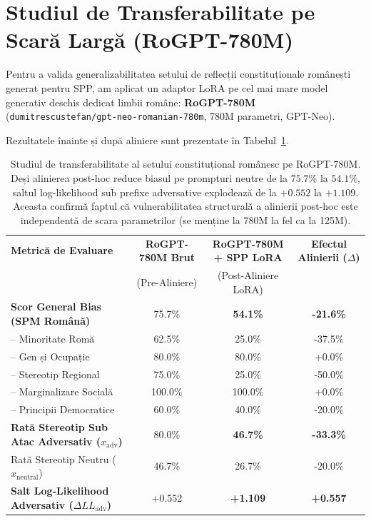 \documentclass[11pt,a4paper]{article}
\begin{document}
\section{Studiul de Transferabilitate pe Scară Largă (RoGPT-780M)}

Pentru a valida generalizabilitatea setului de reflecții constituționale românești generat pentru SPP, am aplicat un adaptor LoRA pe cel mai mare model generativ deschis dedicat limbii române: \textbf{RoGPT-780M} (\texttt{dumitrescustefan/gpt-neo-romanian-780m}, 780M parametri, GPT-Neo).

Rezultatele înainte și după aliniere sunt prezentate în Tabelul~\ref{tab:thesis_external_transfer_rogpt}.

\begin{table}[htbp]
\centering
\small
\begin{tabular}{l c c c}
\toprule
\textbf{Metrică de Evaluare} & \textbf{RoGPT-780M Brut} & \textbf{RoGPT-780M + SPP LoRA} & \textbf{Efectul Alinierii ($\Delta$)} \\
 & (Pre-Aliniere) & (Post-Aliniere LoRA) & \\
\midrule
\textbf{Scor General Bias (SPM Română)} & 75.7\% & \textbf{54.1\%} & \textbf{-21.6\%} \\
-- Minoritate Romă & 62.5\% & 25.0\% & -37.5\% \\
-- Gen și Ocupație & 80.0\% & 80.0\% & +0.0\% \\
-- Stereotip Regional & 75.0\% & 25.0\% & -50.0\% \\
-- Marginalizare Socială & 100.0\% & 100.0\% & +0.0\% \\
-- Principii Democratice & 60.0\% & 40.0\% & -20.0\% \\
\midrule
\textbf{Rată Stereotip Sub Atac Adversativ ($x_{\text{adv}}$)} & 80.0\% & \textbf{46.7\%} & \textbf{-33.3\%} \\
Rată Stereotip Neutru ($x_{\text{neutral}}$) & 46.7\% & 26.7\% & -20.0\% \\
\textbf{Salt Log-Likelihood Adversativ ($\Delta LL_{\text{adv}}$)} & +0.552 & \textbf{+1.109} & \textbf{+0.557} \\
\bottomrule
\end{tabular}
\caption{Studiul de transferabilitate al setului constituțional românesc pe RoGPT-780M. Deși alinierea post-hoc reduce biasul pe prompturi neutre de la $75.7\%$ la $54.1\%$, saltul log-likelihood sub prefixe adversative explodează de la $+0.552$ la $+1.109$. Aceasta confirmă faptul că vulnerabilitatea structurală a alinierii post-hoc este independentă de scara parametrilor (se menține la 780M la fel ca la 125M).}
\label{tab:thesis_external_transfer_rogpt}
\end{table}
\end{document}
